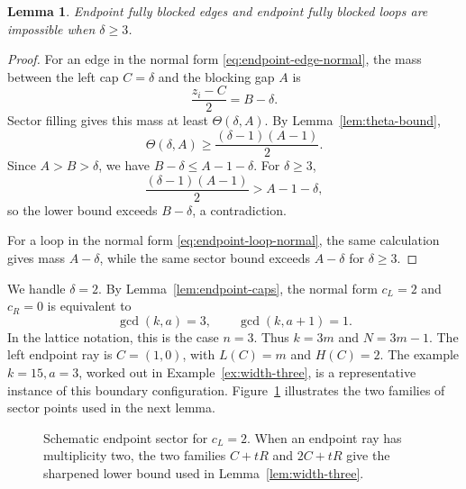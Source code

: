 \documentclass[11pt]{article}
\newtheorem{lemma}[theorem]{Lemma}
\begin{document}
\begin{lemma}\label{lem:endpoint-ge3}
Endpoint fully blocked edges and endpoint fully blocked loops are impossible when \(\delta\ge3\).
\end{lemma}

\begin{proof}
For an edge in the normal form \eqref{eq:endpoint-edge-normal}, the mass between the left cap \(C=\delta\) and the blocking gap \(A\) is
\[
        \frac{z_i-C}{2}=B-\delta.
\]
Sector filling gives this mass at least \(\Theta(\delta,A)\).  By Lemma~\ref{lem:theta-bound},
\[
        \Theta(\delta,A)\ge\frac{(\delta-1)(A-1)}2.
\]
Since \(A>B>\delta\), we have \(B-\delta\le A-1-\delta\).  For \(\delta\ge3\),
\[
        \frac{(\delta-1)(A-1)}2>A-1-\delta,
\]
so the lower bound exceeds \(B-\delta\), a contradiction.

For a loop in the normal form \eqref{eq:endpoint-loop-normal}, the same calculation gives mass \(A-\delta\), while the same sector bound exceeds \(A-\delta\) for \(\delta\ge3\).
\end{proof}

We handle \(\delta=2\).  By Lemma~\ref{lem:endpoint-caps}, the normal form \(c_L=2\) and \(c_R=0\) is equivalent to
\[
        \gcd(k,a)=3,
        \qquad
        \gcd(k,a+1)=1.
\]
In the lattice notation, this is the case \(n=3\).  Thus \(k=3m\) and \(N=3m-1\).  The left endpoint ray is \(C=(1,0)\), with \(L(C)=m\) and \(H(C)=2\).  The example \(k=15,a=3\), worked out in Example~\ref{ex:width-three}, is a representative instance of this boundary configuration.  Figure~\ref{fig:width-three} illustrates the two families of sector points used in the next lemma.



\begin{figure}[htbp]
\centering
{}
\caption{Schematic endpoint sector for \(c_L=2\).  When an endpoint ray has multiplicity two, the two families $C+tR$ and $2C+tR$ give the sharpened lower bound used in Lemma~\ref{lem:width-three}.}
\label{fig:width-three}
\end{figure}
\end{document}
